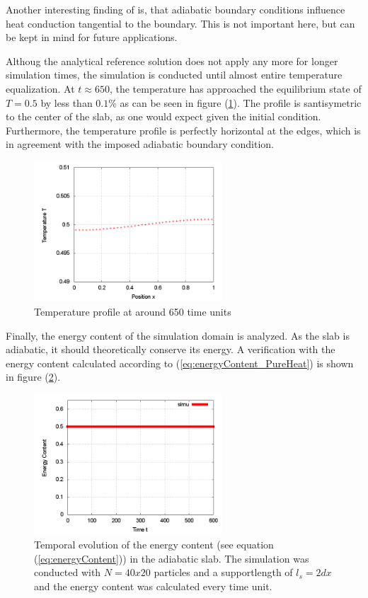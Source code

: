 \documentclass[11pt,a4paper,twoside]{report}
\begin{document}
Another interesting finding of \cite{Cleary1999} is, that adiabatic boundary conditions influence heat conduction tangential to the boundary. This is not important here, but can be kept in mind for future applications.

Althoug the analytical reference solution does not apply any more for longer simulation times, the simulation is conducted until almost entire temperature equalization. At $t\approx 650$, the temperature has approached the equilibrium state of $T=0.5$ by less than $0.1\%$ as can be seen in figure (\ref{fig:PureHeat_TProfile_t650}). The profile is santisymetric to the center of the slab, as one would expect given the initial condition. Furthermore, the temperature profile is perfectly horizontal at the edges, which is in agreement with the imposed adiabatic boundary condition.

\begin{figure}[h]  
  \label{fig:PureHeat_TProfile_t650}
  \centering
  \includegraphics[width=7cm]{Graphics/results/PureHeatConduction/T_profile000650062499}
  \caption{Temperature profile at around 650 time units}
\end{figure}

Finally, the energy content of the simulation domain is analyzed. As the slab is adiabatic, it should theoretically conserve its energy. A verification with the energy content calculated according to (\ref{eq:energyContent_PureHeat}) is shown in figure (\ref{fig:PureHeat_EnergyEvolution}).

\begin{figure}[h]  
  \label{fig:PureHeat_EnergyEvolution}
  \centering
  \includegraphics[width=7cm]{Graphics/results/PureHeatConduction/EnergyContentEvolution}
  \caption[Energy content of adiabatic slab]{Temporal evolution of the energy content (see equation (\ref{eq:energyContent})) in the adiabatic slab. The simulation was conducted with $N=40x20$ particles and a supportlength of $l_s=2dx$ and the energy content was calculated every time unit.}
\end{figure}
\end{document}
